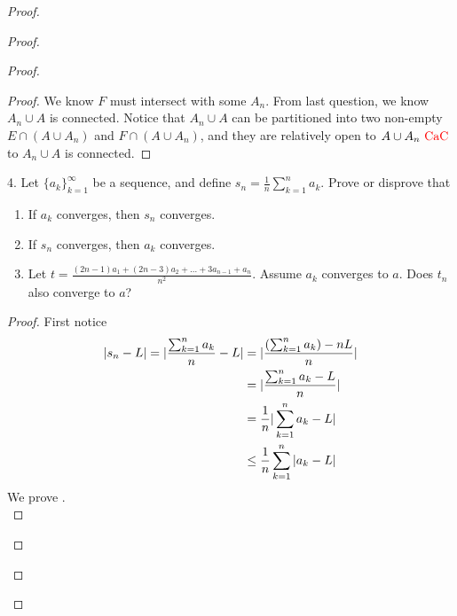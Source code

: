\documentclass{report}
\begin{document}
\begin{proof}
\begin{proof}
\begin{proof}
\begin{proof}
We know $F$ must intersect with some  $A_n$. From last question, we know $A_n\cup A$ is connected. Notice that $A_n\cup A$ can be partitioned into two non-empty $E\cap (A\cup A_n)$ and $F\cap (A\cup A_n)$, and they are relatively open to $A\cup A_n\text{ \textcolor{red}{CaC} }$ to $A_n\cup A$ is connected.
\end{proof}
\begin{question}{}{}
4. Let $\{a_k\}_{k=1}^{\infty}$ be a sequence, and define $s_n = \frac{1}{n} \sum_{k=1}^{n} a_k$. Prove or disprove that
\begin{enumerate}[label=(\alph*)]
  \item If ${a_k}$ converges, then $s_n$ converges.\\
  \item If $s_n$ converges, then $a_k$ converges.\\
  \item Let $t = \frac{(2n-1)a_1 + (2n-3)a_2 + \ldots + 3a_{n-1} + a_n}{n^2}$. Assume ${a_k}$ converges to $a$. Does $t_n$ also converge to $a$?
\end{enumerate}
\end{question}
\begin{proof}
First notice
\begin{align}
  |s_n-L|=|\frac{\sum_{k=1}^n a_k}{n}-L|&=|\frac{(\sum_{k=1}^na_k)-nL}{n}|\\
  &=|\frac{\sum _{k=1}^n a_k-L}{n}|\\
  &=\frac{1}{n}|\sum_{k=1}^n a_k-L|\\
  &\leq \frac{1}{n} \sum_{k=1}^n |a_k-L|
\end{align}
We prove .\\


\end{proof}
\end{proof}
\end{proof}
\end{proof}
\end{document}
